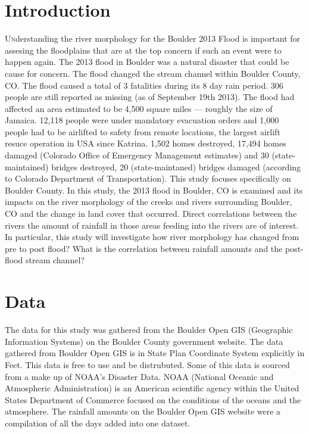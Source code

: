 \documentclass[twoside]{article}
\begin{document}
\begin{multicols}{2} %

\section{Introduction}

\lettrine[nindent=0em,lines=3]{U}nderstanding the river morphology for the Boulder 2013 Flood is important for assesing the floodplains that are at the top concern if such an event were to happen again. The 2013 flood in Boulder was a natural disaster that could be cause for concern. The flood changed the stream channel within Boulder County, CO. The flood caused a total of 3 fatalities during its 8 day rain period. 306 people are still reported as missing (as of September 19th 2013). The flood had affected an area estimated to be 4,500 square miles --- roughly the size of Jamaica. 12,118 people were under mandatory evacuation orders and 1,000 people had to be airlifted to safety from remote locations, the largest airlift resuce operation in USA since Katrina. 1,502 homes destroyed, 17,494 homes damaged (Colorado Office of Emergency Management estimates) and 30 (state-maintained) bridges destroyed, 20 (state-maintaned) bridges damaged (according to Colorado Department of Transportation). \cite{facts} This study focuses specifically on Boulder County. In this study, the 2013 flood in Boulder, CO is examined and its impacts on the river morphology of the creeks and rivers surrounding Boulder, CO and the change in land cover that occurred. Direct correlations between the rivers the amount of rainfall in those areas feeding into the rivers are of interest. In particular, this study will investigate how river morphology has changed from pre to post flood? What is the correlation between rainfall amounts and the post-flood stream channel?

\section{Data}
The data for this study was gathered from the Boulder Open GIS (Geographic Information Systems) on the Boulder County government website. The data gathered from Boulder Open GIS is in State Plan Coordinate System explicitly in Feet. This data is free to use and be distrubuted. Some of this data is sourced from a make up of NOAA's Disaster Data. NOAA (National Oceanic and Atmospheric Administration) is an American scientific agency within the United States Department of Commerce focused on the conditions of the oceans and the atmosphere. \cite{NOAA} The rainfall amounts on the Boulder Open GIS website were a compilation of all the days added into one dataset. 



\end{multicols}
\end{document}
